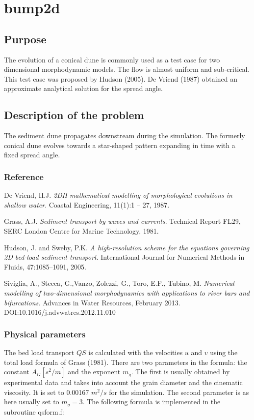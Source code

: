 \chapter{bump2d}
%

%
\section{Purpose}
The evolution of a conical dune
is commonly used as a test case for
two dimensional morphodynamic models. The flow is almost uniform and sub-critical.
This test case was proposed by Hudson (2005). De Vriend (1987) obtained an approximate
analytical solution for the spread angle.

%

%
\section{Description of the problem}
%
The sediment dune propagates downstream during the simulation. The formerly conical dune evolves towards a star-shaped pattern
expanding in time with a fixed spread angle.


\subsection{Reference}

De Vriend, H.J. \textit{2DH mathematical modelling of morphological evolutions in
shallow water}. Coastal Engineering, 11(1):1 – 27, 1987.

Grass, A.J. \textit{Sediment transport by waves and currents}. Technical Report FL29,
SERC London Centre for Marine Technology, 1981.


Hudson, J. and Sweby, P.K. \textit{A high-resolution scheme for the equations
governing 2D bed-load sediment transport}. International Journal for Numerical
Methods in Fluids, 47:1085–1091, 2005.

Siviglia, A., Stecca, G.,Vanzo, Zolezzi, G., Toro, E.F., Tubino, M. \textit{Numerical modelling of two-dimensional
  morphodynamics with applications to river bars   and bifurcations}. Advances in Water Resources, February 2013.
DOI:10.1016/j.advwatres.2012.11.010


\subsection{Physical parameters}
%
The bed load transport $QS$ is calculated with the velocities $u$ and $v$
using the total load formula of Grass (1981).
There are two parameters in the formula: the constant $A_G [s^2/m]$ and the exponent $m_g$.
The first is usually obtained by experimental data and takes into account
the grain diameter and the cinematic viscosity. It is set to 0.00167 $m^2/s$ for the simulation.
The second parameter is as here usually set to $m_g=3$.
The following formula is implemented in the subroutine qsform.f:

